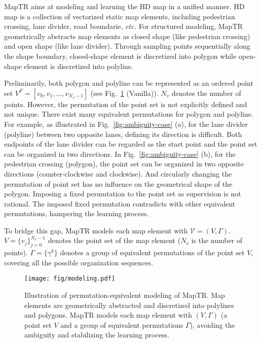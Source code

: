 \documentclass{article} \usepackage{iclr2023_conference,times}
\def\etc{\emph{etc.}}
\begin{document}
MapTR aims at modeling and learning the HD map in a unified manner.
HD map is a collection of vectorized static map elements, including pedestrian crossing, lane divider, road boundarie, \etc{}
For structured modeling,  MapTR geometrically abstracts map elements as closed shape (like pedestrian crossing) and open shape (like lane divider). 
Through sampling points sequentially along the shape boundary, closed-shape element is discretized into polygon while open-shape element is discretized into polyline. 

Preliminarily,  both polygon and polyline can be represented as an ordered point set ${V}^{F}= [v_0, v_1, \dots, v_{N_v-1}]$ (see Fig.~\ref{fig:modeling} (Vanilla)). $N_v$ denotes the number of points. However, the permutation of the point set is not explicitly defined and not unique. There exist many equivalent permutations for polygon and polyline.
For example, as illustrated in Fig.~\ref{fig:ambiguity-case} (a), for the lane divider (polyline) between two opposite lanes, defining its direction is difficult. Both endpoints of the lane divider can be regarded as the start point and the point set can be organized in two directions.
In Fig.~\ref{fig:ambiguity-case} (b), for the pedestrian crossing (polygon), the point set can be organized in two opposite directions (counter-clockwise and clockwise). And circularly changing the permutation of point set has no influence on the geometrical shape of the polygon.
Imposing a fixed permutation to the point set as supervision is not rational. The imposed fixed permutation contradicts with other equivalent permutations, hampering the learning process.




To bridge this gap, MapTR models each map element with $\mathcal{V}=(V,\Gamma)$. 
$V = \{v_{j}\}_{j=0}^{N_v-1}$ denotes the point set  of the map element ($N_v$ is the number of points). 
$\Gamma = \{\gamma^{k}\}$  denotes a group of equivalent permutations of the point set $V$, covering all the possible organization sequences.


\begin{figure}[]
    \begin{center}
    \texttt{[image: fig/modeling.pdf]}
    \end{center}
    \vspace*{-0.3cm}
    \caption{Illustration of permutation-equivalent modeling of MapTR. Map elements are geometrically abstracted and discretized into polylines and polygons.
    MapTR models each map element  with $(V, \Gamma)$ (a point set $V$ and a group of equivalent permutations $\Gamma$), avoiding the  ambiguity and stabilizing the learning process.}
    \label{fig:modeling}
    \vspace*{-0.5cm}
\end{figure}
\end{document}
